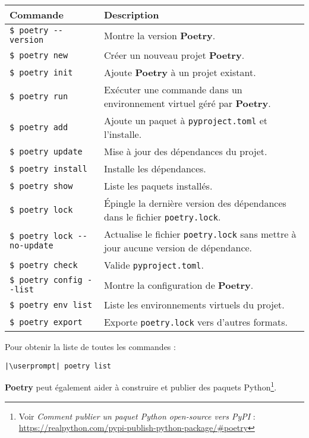 \begin{center}
\begin{table}[h!]
\begin{tabularx}{\textwidth}{|l|X|}
\hline
\textbf{Commande} & \textbf{Description} \\ \hline
\verb|$ poetry --version| & Montre la version \textbf{Poetry}. \\ \hline
\verb|$ poetry new| & Créer un nouveau projet \textbf{Poetry}. \\ \hline
\verb|$ poetry init| & Ajoute \textbf{Poetry} à un projet existant. \\ \hline
\verb|$ poetry run| & Exécuter une commande dans un environnement virtuel géré par \textbf{Poetry}. \\ \hline
\verb|$ poetry add| & Ajoute un paquet à \verb|pyproject.toml| et l'installe. \\ \hline
\verb|$ poetry update| & Mise à jour des dépendances du projet. \\ \hline
\verb|$ poetry install| & Installe les dépendances. \\ \hline
\verb|$ poetry show| & Liste les paquets installés. \\ \hline
\verb|$ poetry lock| & Épingle la dernière version des dépendances dans le fichier \verb|poetry.lock|. \\ \hline
\verb|$ poetry lock --no-update| & Actualise le fichier \verb|poetry.lock| sans mettre à jour aucune version de dépendance. \\ \hline
\verb|$ poetry check| & Valide \verb|pyproject.toml|. \\ \hline
\verb|$ poetry config --list| & Montre la configuration de \textbf{Poetry}. \\ \hline
\verb|$ poetry env list| & Liste les environnements virtuels du projet. \\ \hline
\verb|$ poetry export| & Exporte \verb|poetry.lock| vers d'autres formats. \\ \hline
\end{tabularx}
\end{table}
\end{center}

Pour obtenir la liste de toutes les commandes :
\begin{lstlisting}[style=bash]
|\userprompt| poetry list
\end{lstlisting}

\textbf{Poetry} peut également aider à construire et publier des paquets Python\footnote{Voir \og \textit{Comment publier un paquet Python open-source vers PyPI}\fg{} : \url{https://realpython.com/pypi-publish-python-package/\#poetry}}.
\bigskip

